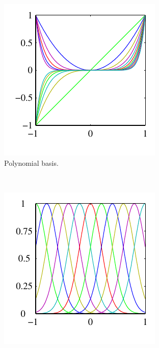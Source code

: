 \begin{figure}
\centering
	\begin{subfigure}[b]{0.3\textwidth}
                \centering
                \includegraphics[width=\textwidth]{./lecture5/Figure31a.pdf}
                \caption{Polynomial basis.}
    \end{subfigure}%
	~
	\begin{subfigure}[b]{0.3\textwidth}
                \centering
                \includegraphics[width=\textwidth]{./lecture5/Figure31b.pdf}

\end{subfigure}
\end{figure}
